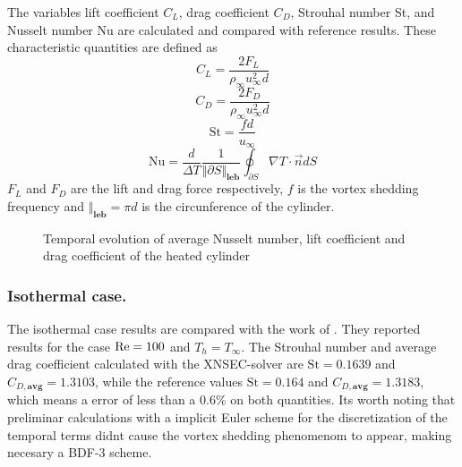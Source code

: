 The variables lift coefficient $C_L$, drag coefficient $C_D$, Strouhal number St, and Nusselt number Nu are calculated and compared with reference results. These characteristic quantities are defined as
\begin{equation} 
	C_L = \frac{2F_L}{\rho_\infty u^2_\infty d}
\end{equation}
\begin{equation}
	C_D = \frac{2F_D}{\rho_\infty u^2_\infty d}
\end{equation}
\begin{equation}
	\text{St} = \frac{fd}{u_\infty}
\end{equation}
\begin{equation}
	\text{Nu} = \frac{d}{\Delta T}\frac{1}{\Vert \partial S\Vert_{\textbf{leb}}}\oint_{\partial S} \nabla T \cdot \vec{n} dS
\end{equation}
$F_L$ and $F_D$ are the lift and drag force respectively, $f$ is the vortex shedding frequency and $\Vert_{\textbf{leb}} = \pi d$ is the circunference of the cylinder.
\begin{figure}[t]
	\centering	
	\caption{Temporal evolution of average Nusselt number, lift coefficient and drag coefficient of the heated cylinder}	\label{fig:HeatedCylinderResults}
\end{figure}
\subsubsection{Isothermal case.}
The isothermal case results are compared with the work of \textcite{sharmaHEATFLUIDFLOW2004}. They reported results for the case $\text{Re} = 100$ and $T_h = T_\infty$. The Strouhal number and average drag coefficient calculated with the XNSEC-solver are $\text{St} = 0.1639$ and $C_{D,\textbf{avg}} = 1.3103$, while the reference values $\text{St} = 0.164$ and $C_{D,\textbf{avg}} = 1.3183$, which means a error of less than a 0.6\% on both quantities. Its worth noting that preliminar calculations with a implicit Euler scheme for the discretization of the temporal terms didnt cause the vortex shedding phenomenom to appear, making necesary a BDF-3 scheme.
